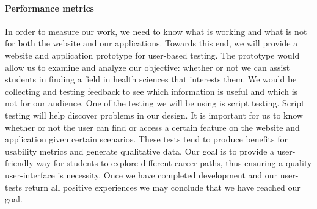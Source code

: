 \documentclass[letterpaper,10pt]{article}
\begin{document}

 \paragraph {Performance metrics}

In order to measure our work, we need to know what is working and what is not for both the website and our applications. Towards this end, we will provide a website and application prototype for user-based testing. The prototype would allow us to examine and analyze our objective: whether or not we can assist students in finding a field in health sciences that interests them. We would be collecting and testing feedback to see which information is useful and which is not for our audience. One of the testing we will be using is script testing. Script testing will help discover problems in our design. It is important for us to know whether or not the user can find or access a certain feature on the website and application given certain scenarios. These tests tend to produce benefits for usability metrics and generate qualitative data. Our goal is to provide a user-friendly way for students to explore different career paths, thus ensuring a quality user-interface is necessity. Once we have completed development and our user-tests return all positive experiences we may conclude that we have reached our goal.

        


    
\end{document}
